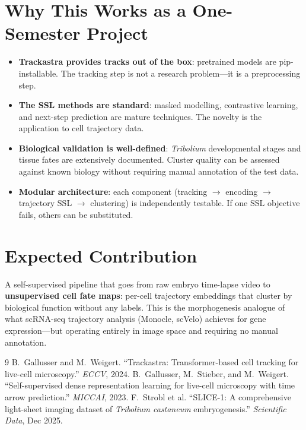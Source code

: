 \documentclass{article}
\begin{document}
\section*{Why This Works as a One-Semester Project}

\begin{itemize}
	\item \textbf{Trackastra provides tracks out of the box}: pretrained models are pip-installable. The tracking step is not a research problem---it is a preprocessing step.
	\item \textbf{The SSL methods are standard}: masked modelling, contrastive learning, and next-step prediction are mature techniques. The novelty is the application to cell trajectory data.
	\item \textbf{Biological validation is well-defined}: \textit{Tribolium} developmental stages and tissue fates are extensively documented. Cluster quality can be assessed against known biology without requiring manual annotation of the test data.
	\item \textbf{Modular architecture}: each component (tracking $\to$ encoding $\to$ trajectory SSL $\to$ clustering) is independently testable. If one SSL objective fails, others can be substituted.
\end{itemize}

\section*{Expected Contribution}

A self-supervised pipeline that goes from raw embryo time-lapse video to \textbf{unsupervised cell fate maps}: per-cell trajectory embeddings that cluster by biological function without any labels. This is the morphogenesis analogue of what scRNA-seq trajectory analysis (Monocle, scVelo) achieves for gene expression---but operating entirely in image space and requiring no manual annotation.

\begin{thebibliography}{9}
	 B.~Gallusser and M.~Weigert. ``Trackastra: Transformer-based cell tracking for live-cell microscopy.'' \textit{ECCV}, 2024.
	 B.~Gallusser, M.~Stieber, and M.~Weigert. ``Self-supervised dense representation learning for live-cell microscopy with time arrow prediction.'' \textit{MICCAI}, 2023.
	 F.~Strobl et al. ``SLICE-1: A comprehensive light-sheet imaging dataset of \textit{Tribolium castaneum} embryogenesis.'' \textit{Scientific Data}, Dec 2025.
\end{thebibliography}
\end{document}
